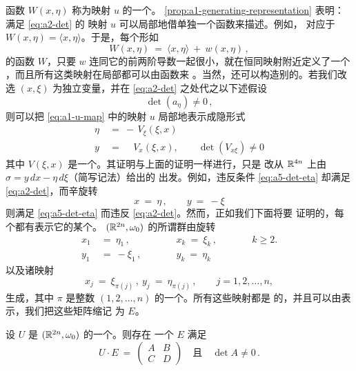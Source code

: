函数 $W(x,\eta)$ 称为\trSymplectic{}映射 $u$ 的一个\trGeneratingFunction。%
\cref{prop:a1-generating-representation} 表明：满足 \eqref{eq:a2-det} 的%
\trSymplectic{}映射 $u$ 可以局部地借单独一个函数来描述。例如，\trIdentityMap{}%
对应于 $W(x,\eta)=\langle x,\eta\rangle$。于是，每个形如
\[
W(x,\eta)\ =\ \langle x,\eta\rangle\ +\ w(x,\eta)\,,
\]
的函数 $W$，只要 $w$ 连同它的前两阶导数一起很小，就在恒同映射附近定义了一个%
\trSymplectic\trMapping，而且所有这类映射在局部都可以由函数来%
\trParametrization。当然，还可以构造别的\trGeneratingFunction。若我们改选%
 $(x,\xi)$ 为独立变量，并在 \eqref{eq:a2-det} 之处代之以下述假设
\begin{equation}\label{eq:a5-det-eta}
\det(a_{\eta})\neq0\,,
\end{equation}
则可以把 \eqref{eq:a1-u-map} 中的映射 $u$ 局部地表示成隐形式
\begin{equation}\label{eq:a6-implicit-v}
\begin{aligned}
\eta\ &=\ -\,V_{\xi}(\xi,x)\\
y\ &=\ \phantom{-\,}V_{x}(\xi,x),\qquad\det(V_{x\xi})\neq0
\end{aligned}
\end{equation}
其中 $V(\xi,x)$ 是一个\trGeneratingFunction。其证明与上面的证明一样进行，只是%
改从 $\mathbb{R}^{4n}$ 上由 $\sigma=y\,dx-\eta\,d\xi$（简写记法）给出的\trOneForm{}%
出发。例如，\trIdentityMap{}违反条件 \eqref{eq:a5-det-eta} 却满足%
 \eqref{eq:a2-det}，而辛旋转
\[
x\ =\ \eta\,,\qquad y\ =\ -\xi
\]
则满足 \eqref{eq:a5-det-eta} 而违反 \eqref{eq:a2-det}。然而，正如我们下面将要%
证明的，每个\trSymplectic\trMapping{}都有表示它的某个\trGeneratingFunction。%
$(\mathbb{R}^{2n},\omega_{0})$ 的所谓\trElementary\trSymplectic{}\trTransformation{}群由旋转
\[
\begin{aligned}
x_{1}\ &=\ \eta_{1}\,,\qquad &&x_{k}\ =\ \xi_{k}\,,\qquad &&k\geq2.\\
y_{1}\ &=\ -\xi_{1}\,,\qquad &&y_{k}\ =\ \eta_{k}
\end{aligned}
\]
以及诸映射
\[
x_{j}\ =\ \xi_{\pi(j)}\,,\ y_{j}\ =\ \eta_{\pi(j)}\,,\qquad j=1,2,\ldots,n,
\]
生成，其中 $\pi$ 是整数 $(1,2,\ldots,n)$ 的一个\trPermutation{}。所有这些映射都是%
\trSymplectic{}的，并且可以由\trSymplecticMatrix{}表示，我们把这些矩阵缩记%
为 $E$。

\begin{proposition}\label{prop:a1-elementary-e}
设 $U$ 是 $(\mathbb{R}^{2n},\omega_{0})$ 的一个\trLinear\trSymplectic\trMapping。则存在%
一个\trElementary\trSymplectic{}\trTransformation{} $E$ 满足
\[
U\cdot E\ =\
\begin{pmatrix} A & B\\ C & D \end{pmatrix}
\quad\text{且}\quad\det A\neq0\,.
\]
\end{proposition}

